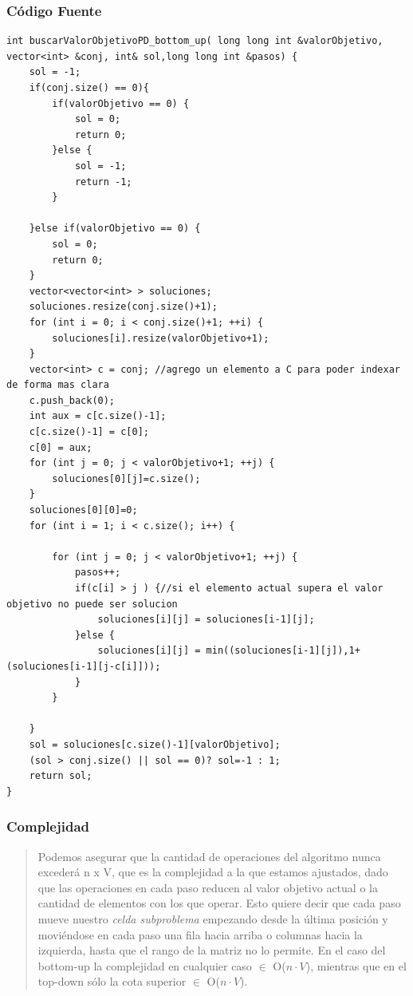 \documentclass[7pt,a4paper]{article}
\begin{document}
\subsubsection{Código Fuente}
\begin{lstlisting}
int buscarValorObjetivoPD_bottom_up( long long int &valorObjetivo, vector<int> &conj, int& sol,long long int &pasos) {
    sol = -1;
    if(conj.size() == 0){
        if(valorObjetivo == 0) {
            sol = 0;
            return 0;
        }else {
            sol = -1;
            return -1;
        }

    }else if(valorObjetivo == 0) {
        sol = 0;
        return 0;
    }
    vector<vector<int> > soluciones;
    soluciones.resize(conj.size()+1);
    for (int i = 0; i < conj.size()+1; ++i) {
        soluciones[i].resize(valorObjetivo+1);
    }
    vector<int> c = conj; //agrego un elemento a C para poder indexar de forma mas clara
    c.push_back(0);
    int aux = c[c.size()-1];
    c[c.size()-1] = c[0];
    c[0] = aux;
    for (int j = 0; j < valorObjetivo+1; ++j) {
        soluciones[0][j]=c.size();
    }
    soluciones[0][0]=0;
    for (int i = 1; i < c.size(); i++) {

        for (int j = 0; j < valorObjetivo+1; ++j) {
            pasos++;
            if(c[i] > j ) {//si el elemento actual supera el valor objetivo no puede ser solucion
                soluciones[i][j] = soluciones[i-1][j];
            }else {
                soluciones[i][j] = min((soluciones[i-1][j]),1+(soluciones[i-1][j-c[i]]));
            }
        }

    }
    sol = soluciones[c.size()-1][valorObjetivo];
    (sol > conj.size() || sol == 0)? sol=-1 : 1;
    return sol;
}
\end{lstlisting}


\subsubsection{Complejidad}
\begin{verse}
Podemos asegurar que la cantidad de operaciones del algoritmo nunca excederá n x V, que es la complejidad a la que estamos ajustados, dado que las operaciones en cada paso reducen al  valor objetivo actual o la cantidad de elementos con los que operar. Esto quiere decir que cada paso mueve nuestro {\it celda subproblema} empezando desde la última posición y moviéndose en cada paso una fila hacia arriba o columnas hacia la izquierda, hasta que el rango de la matriz no lo permite.
En el caso del bottom-up la complejidad en cualquier caso $\in$ O($n \cdot V$), mientras que en el top-down sólo la cota superior $\in$ O($n \cdot V$). 
\end{verse}
\end{document}
